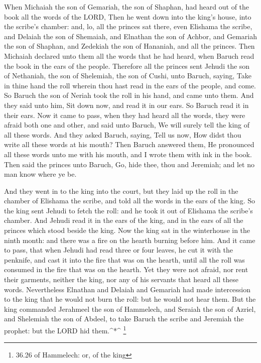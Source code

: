  When Michaiah the son of Gemariah, the son of Shaphan, had
heard out of the book all the words of the LORD,  Then he
went down into the king's house, into the scribe's chamber: and, lo, all
the princes sat there, even Elishama the scribe, and Delaiah the son of
Shemaiah, and Elnathan the son of Achbor, and Gemariah the son of
Shaphan, and Zedekiah the son of Hananiah, and all the princes.
 Then Michaiah declared unto them all the words that he had
heard, when Baruch read the book in the ears of the people.
 Therefore all the princes sent Jehudi the son of
Nethaniah, the son of Shelemiah, the son of Cushi, unto Baruch, saying,
Take in thine hand the roll wherein thou hast read in the ears of the
people, and come. So Baruch the son of Neriah took the roll in his hand,
and came unto them.  And they said unto him, Sit down now,
and read it in our ears. So Baruch read it in their ears. 
Now it came to pass, when they had heard all the words, they were afraid
both one and other, and said unto Baruch, We will surely tell the king
of all these words.  And they asked Baruch, saying, Tell us
now, How didst thou write all these words at his mouth? 
Then Baruch answered them, He pronounced all these words unto me with
his mouth, and I wrote them with ink in the book.  Then
said the princes unto Baruch, Go, hide thee, thou and Jeremiah; and let
no man know where ye be.

 And they went in to the king into the court, but they laid
up the roll in the chamber of Elishama the scribe, and told all the
words in the ears of the king.  So the king sent Jehudi to
fetch the roll: and he took it out of Elishama the scribe's chamber. And
Jehudi read it in the ears of the king, and in the ears of all the
princes which stood beside the king.  Now the king sat in
the winterhouse in the ninth month: and there was a fire on the hearth
burning before him.  And it came to pass, that when Jehudi
had read three or four leaves, he cut it with the penknife, and cast it
into the fire that was on the hearth, until all the roll was consumed in
the fire that was on the hearth.  Yet they were not afraid,
nor rent their garments, neither the king, nor any of his servants that
heard all these words.  Nevertheless Elnathan and Delaiah
and Gemariah had made intercession to the king that he would not burn
the roll: but he would not hear them.  But the king
commanded Jerahmeel the son of Hammelech, and Seraiah the son of Azriel,
and Shelemiah the son of Abdeel, to take Baruch the scribe and Jeremiah
the prophet: but the LORD hid them.\^{}*\^{} \footnote{36.26 of
  Hammelech: or, of the king}

